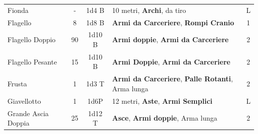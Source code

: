 \documentclass[a4paper,11pt,twoside,openany]{book}
\begin{document}
\begin{tabularx}{1\textwidth}{lccXc}
Fionda& -& 1d4 B& 10 metri, \textbf{Archi}, da tiro& L\\
Flagello& 8& 1d8 B& \textbf{Armi da Carceriere}, \textbf{Rompi Cranio}& 1\\
Flagello Doppio& 90 & 1d10 B& \textbf{Armi doppie}, \textbf{Armi da Carceriere}& 2\\
Flagello Pesante& 15 & 1d10 B& \textbf{Armi Doppie}, \textbf{Armi da Carceriere}& 2\\
Frusta& 1& 1d3 T& \textbf{Armi da Carceriere}, \textbf{Palle Rotanti}, Arma lunga& 2\\
Giavellotto& 1& 1d6P& 12 metri, \textbf{Aste}, \textbf{Armi Semplici}& L\\
Grande Ascia Doppia& 25 & 1d12 T& \textbf{Asce}, \textbf{Armi doppie}, Arma lunga& 2\\


\end{tabularx}

\bigskip
\end{document}
